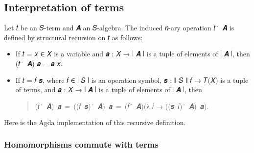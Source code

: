 \documentclass[a4paper,USenglish,cleveref,autoref,thm-restate]{lipics-v2019}
\begin{document}
\subsection{Interpretation of terms}\label{interpretation-of-terms}
Let 𝑡 be an 𝑆-term and 𝑨 an 𝑆-algebra. The induced 𝑛-ary operation 𝑡\ ̇\ 𝑨 is defined by structural recursion on 𝑡 as follows:
\begin{itemize}
\item If 𝑡 = 𝑥 ∈ 𝑋 is a variable and 𝒂 : 𝑋 → ∣ 𝑨 ∣ is a tuple of elements of ∣ 𝑨 ∣, then\\ (𝑡\ ̇\ 𝑨) 𝒂 = 𝒂 𝑥.
\item If 𝑡 = 𝑓 𝒔, where 𝑓 ∈ ∣ 𝑆 ∣ is an operation symbol, 𝒔 : ∥ 𝑆 ∥ 𝑓 → 𝑇(𝑋) is a tuple of terms, and 𝒂 : 𝑋 → ∣ 𝑨 ∣ is a tuple of elements of ∣ 𝑨 ∣, then
  \begin{quote}
    (𝑡\ ̇\ 𝑨)\ 𝒂\ =\ ((𝑓\ 𝒔)\ ̇\ 𝑨)\ 𝒂\ =\ (𝑓\ ̂\ 𝑨)(λ 𝑖 → ((𝒔\ 𝑖)\ ̇\ 𝑨)\ 𝒂).
    \end{quote}
\end{itemize}
Here is the Agda implementation of this recursive definition.
\begin{code}\end{code}


\begin{comment}
  Next we show that if 𝑝 : 𝑇(𝑋) is a term, then there exists 𝓅 : 𝑇(𝑋) and 𝒕 : 𝑋 → 𝑇(𝑋) such that 𝑝 ≡ (𝓅\ ̇\ 𝑻(𝑋))\ 𝒕. We prove this fact in the following module:
  \begin{code}\end{code}
  Next we have some definitions that are sometimes useful when dealing with the interpretations of terms in a product structure.
  \begin{code}\end{code}
  \subsection{Compatibility of terms}\label{compatibility-of-terms}
  Here we present the formal proof of the fact that homomorphisms and terms are compatible.  That is, if 𝑨 and 𝑩 are 𝑆-algebras, h : 𝑨 → 𝑩 a homomorphism, and 𝑡 a term in the language of 𝑆, then for all a : X → ∣ 𝑨 ∣ we have \(h (t^{𝑨} a) = t^{𝑩} (h ∘ a)\).
\end{comment}

\subsubsection{Homomorphisms commute with terms}\label{homomorphisms-commute-with-terms}
\begin{code}\end{code}
\end{document}
